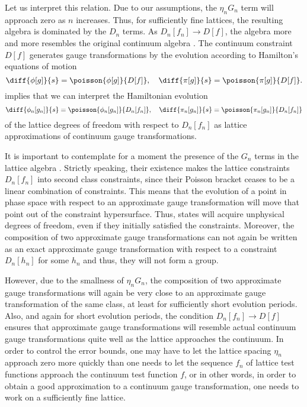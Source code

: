 Let us interpret this relation.
Due to our assumptions, the $\eta_n G_n$ term will approach zero as $n$ increases.
Thus, for sufficiently fine lattices, the resulting algebra is dominated by the $D_n$ terms.
As $D_n[f_n]\to D[f]$, the algebra more and more resembles the original continuum algebra .
The continuum constraint $D[f]$ generates gauge transformations by the evolution according to Hamilton's equations of motion
\begin{equation}
    \diff{\phi[g]}{s} = \poisson{\phi[g]}{D[f]}, \quad \diff{\pi[g]}{s} = \poisson{\pi[g]}{D[f]}.
\end{equation}
 implies that we can interpret the Hamiltonian evolution
\begin{equation}
    \diff{\phi_n[g_n]}{s} = \poisson{\phi_n[g_n]}{D_n[f_n]}, \quad \diff{\pi_n[g_n]}{s} = \poisson{\pi_n[g_n]}{D_n[f_n]} \label{eq:hamiltons-equations}
\end{equation}
of the lattice degrees of freedom with respect to $D_n[f_n]$ as lattice approximations of continuum gauge transformations.

It is important to contemplate for a moment the presence of the $G_n$ terms in the lattice algebra .
Strictly speaking, their existence makes the lattice constraints $D_n[f_n]$ into second class constraints, since their Poisson bracket ceases to be a linear combination of constraints.
This means that the evolution of a point in phase space with respect to an approximate gauge transformation will move that point out of the constraint hypersurface.
Thus, states will acquire unphysical degrees of freedom, even if they initially satisfied the constraints.
Moreover, the composition of two approximate gauge transformations can not again be written as an exact approximate gauge transformation with respect to a constraint $D_n[h_n]$ for some $h_n$ and thus, they will not form a group.

However, due to the smallness of $\eta_n G_n$, the composition of two approximate gauge transformations will again be very close to an approximate gauge transformation of the same class, at least for sufficiently short evolution periods.
Also, and again for short evolution periods, the condition $D_n[f_n]\to D[f]$ ensures that approximate gauge transformations will resemble actual continuum gauge transformations quite well as the lattice approaches the continuum.
In order to control the error bounds, one may have to let the lattice spacing $\eta_n$ approach zero more quickly than one needs to let the sequence $f_n$ of lattice test functions approach the continuum test function $f$, or in other words, in order to obtain a good approximation to a continuum gauge transformation, one needs to work on a sufficiently fine lattice.

